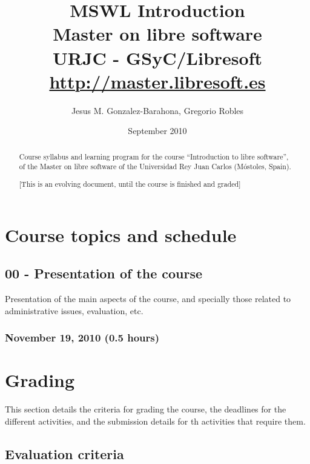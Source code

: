 \documentclass[a4paper]{article}
\title{MSWL Introduction \\
Master on libre software \\
URJC - GSyC/Libresoft \\
\url{http://master.libresoft.es}}
\author{Jesus M. Gonzalez-Barahona, Gregorio Robles}
\date{September 2010}
\begin{document}
\maketitle

\begin{abstract}
Course syllabus and learning program for the course ``Introduction to libre software'', of the Master on libre software of the Universidad Rey Juan Carlos (Móstoles, Spain).

[This is an evolving document, until the course is finished and graded]
\end{abstract}

\tableofcontents

\section{Course topics and schedule}

\subsection{00 - Presentation of the course}

Presentation of the main aspects of the course, and specially those related to administrative issues, evaluation, etc.

\subsubsection{November 19, 2010 (0.5 hours)}


\section{Grading}

This section details the criteria for grading the course, the deadlines for the different activities, and the submission details for th activities that require them.

\subsection{Evaluation criteria}
\label{sub:evaluation-criteria}
\end{document}
